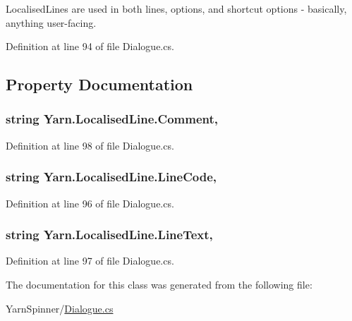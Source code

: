 Localised\-Lines are used in both lines, options, and shortcut options -\/ basically, anything user-\/facing. 

Definition at line 94 of file Dialogue.\-cs.



\subsection{Property Documentation}
\hypertarget{a00134_afbfb834bb1623653fa73945c221c4b9d}{
\subsubsection[{Comment}]{\setlength{\rightskip}{0pt plus 5cm}string Yarn.\-Localised\-Line.\-Comment\hspace{0.3cm}{\ttfamily [get]}, {\ttfamily [set]}}}\label{a00134_afbfb834bb1623653fa73945c221c4b9d}


Definition at line 98 of file Dialogue.\-cs.

\hypertarget{a00134_aad88f588cbbe2df9bb83da59eeff3d3c}{
\subsubsection[{Line\-Code}]{\setlength{\rightskip}{0pt plus 5cm}string Yarn.\-Localised\-Line.\-Line\-Code\hspace{0.3cm}{\ttfamily [get]}, {\ttfamily [set]}}}\label{a00134_aad88f588cbbe2df9bb83da59eeff3d3c}


Definition at line 96 of file Dialogue.\-cs.

\hypertarget{a00134_ab0b4fa82cfa7693ff3c96fe5c3837fff}{
\subsubsection[{Line\-Text}]{\setlength{\rightskip}{0pt plus 5cm}string Yarn.\-Localised\-Line.\-Line\-Text\hspace{0.3cm}{\ttfamily [get]}, {\ttfamily [set]}}}\label{a00134_ab0b4fa82cfa7693ff3c96fe5c3837fff}


Definition at line 97 of file Dialogue.\-cs.



The documentation for this class was generated from the following file\-:\begin{DoxyCompactItemize}
\item 
Yarn\-Spinner/\hyperlink{a00305}{Dialogue.\-cs}\end{DoxyCompactItemize}
